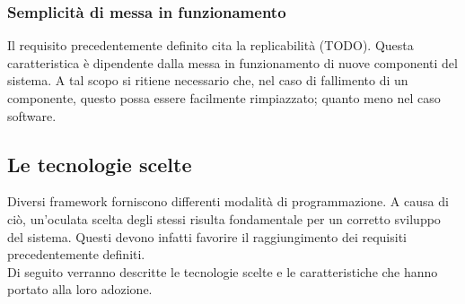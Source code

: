 \subsubsection{Semplicità di messa in funzionamento}
Il requisito precedentemente definito cita la replicabilità (TODO). Questa caratteristica è dipendente dalla messa in funzionamento di nuove componenti del sistema. A tal scopo si ritiene necessario che, nel caso di fallimento di un componente, questo possa essere facilmente rimpiazzato; quanto meno nel caso software.

\subsection{Le tecnologie scelte}
Diversi framework forniscono differenti modalità di programmazione. A causa di ciò, un'oculata scelta degli stessi risulta fondamentale per un corretto sviluppo del sistema. Questi devono infatti favorire il raggiungimento dei requisiti precedentemente definiti.\\
Di seguito verranno descritte le tecnologie scelte e le caratteristiche che hanno portato alla loro adozione.







